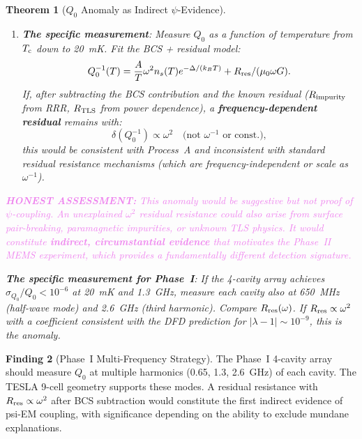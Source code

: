 \documentclass[11pt]{article}
\newtheorem{theorem}{Theorem}[section]
\theoremstyle{definition}
\newtheorem{finding}[theorem]{Finding}
\theoremstyle{remark}
\newcommand{\Tc}{T_{\rm c}}
\newcommand{\lam}{|\lambda-1|}
\newcommand{\honest}[1]{\textcolor{violet}{\textbf{HONEST ASSESSMENT:} #1}}
\begin{document}
\begin{theorem}[$Q_0$ Anomaly as Indirect $\psi$-Evidence]
\begin{enumerate}
  \item \textbf{The specific measurement}: Measure $Q_0$ as a function
    of temperature from $\Tc$ down to 20~mK. Fit the BCS + residual
    model:
    \begin{equation}
      Q_0^{-1}(T) = \frac{A}{T}\omega^2 n_s(T) e^{-\Delta/(k_BT)}
      + R_{\rm res}/(\mu_0\omega G).
    \end{equation}
    If, after subtracting the BCS contribution and the
    known residual ($R_{\rm impurity}$ from RRR, $R_{\rm TLS}$ from
    power dependence), a \textbf{frequency-dependent residual} remains
    with:
    \begin{equation}
      \delta(Q_0^{-1}) \propto \omega^2 \quad\text{(not $\omega^{-1}$ or const.)},
      \label{eq:freq_dependence}
    \end{equation}
    this would be consistent with Process~A and inconsistent with
    standard residual resistance mechanisms (which are
    frequency-independent or scale as $\omega^{-1}$).
\end{enumerate}

\honest{This anomaly would be \emph{suggestive} but not \emph{proof}
of $\psi$-coupling. An unexplained $\omega^2$ residual resistance could
also arise from surface pair-breaking, paramagnetic impurities, or
unknown TLS physics. It would constitute \textbf{indirect, circumstantial
evidence} that motivates the Phase~II MEMS experiment, which provides a
fundamentally different detection signature.}

\textbf{The specific measurement for Phase~I}: If the 4-cavity array
achieves $\sigma_{Q_0}/Q_0 < 10^{-6}$ at 20~mK and 1.3~GHz, measure
each cavity also at 650~MHz (half-wave mode) and 2.6~GHz (third
harmonic). Compare $R_{\rm res}(\omega)$. If $R_{\rm res} \propto
\omega^2$ with a coefficient consistent with the DFD prediction for
$\lam \sim 10^{-9}$, this is the anomaly.
\end{theorem}

\begin{finding}[Phase~I Multi-Frequency Strategy]
\label{find:multi_freq}
The Phase~I 4-cavity array should measure $Q_0$ at multiple harmonics
(0.65, 1.3, 2.6~GHz) of each cavity. The TESLA 9-cell geometry supports
these modes. A residual resistance with $R_{\rm res} \propto \omega^2$
after BCS subtraction would constitute the first indirect evidence of
psi-EM coupling, with significance depending on the ability to exclude
mundane explanations.
\end{finding}
\end{document}
